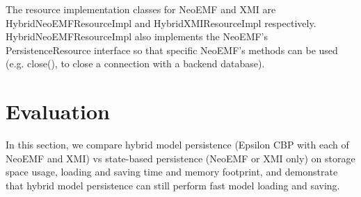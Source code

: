 The resource implementation classes for NeoEMF and XMI are \textsf{HybridNeoEMFResourceImpl} and \textsf{HybridXMIResourceImpl} respectively. \textsf{HybridNeoEMFResourceImpl} also implements the NeoEMF's \textsf{PersistenceResource} interface %
so that specific NeoEMF's methods can be used (e.g. \textsf{close}(), to close a connection with a backend database).


%
%

\vspace{-15pt}
\section{Evaluation}
\label{sec:evaluation}

\vspace{-10pt}
In this section, we compare hybrid model persistence (Epsilon CBP with each of NeoEMF and XMI) vs state-based persistence (NeoEMF or XMI only) on storage space usage, loading and saving time and memory footprint, and demonstrate that hybrid model persistence can still perform fast model loading and saving. 

